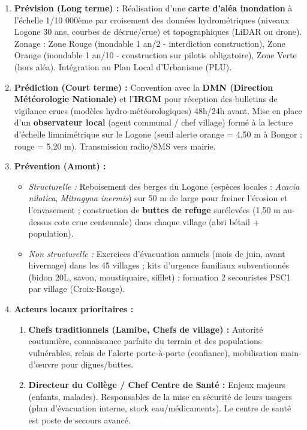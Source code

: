 \documentclass[11pt]{article}
\begin{document}
\begin{corrige}
\begin{enumerate}
    \item \textbf{Prévision (Long terme) :} Réalisation d'une \textbf{carte d'aléa inondation} à l'échelle 1/10 000ème par croisement des données hydrométriques (niveaux Logone 30 ans, courbes de décrue/crue) et topographiques (LiDAR ou drone). Zonage : Zone Rouge (inondable 1 an/2 - interdiction construction), Zone Orange (inondable 1 an/10 - construction sur pilotis obligatoire), Zone Verte (hors aléa). Intégration au Plan Local d'Urbanisme (PLU).
    \item \textbf{Prédiction (Court terme) :} Convention avec la \textbf{DMN (Direction Météorologie Nationale)} et l'\textbf{IRGM} pour réception des bulletins de vigilance crues (modèles hydro-météorologiques) 48h/24h avant. Mise en place d'un \textbf{observateur local} (agent communal / chef village) formé à la lecture d'échelle limnimétrique sur le Logone (seuil alerte orange = 4,50 m à Bongor ; rouge = 5,20 m). Transmission radio/SMS vers mairie.
    \item \textbf{Prévention (Amont) :}
        \begin{itemize}
            \item \textit{Structurelle :} Reboisement des berges du Logone (espèces locales : \emph{Acacia nilotica}, \emph{Mitragyna inermis}) sur 50 m de large pour freiner l'érosion et l'envasement ; construction de \textbf{buttes de refuge} surélevées (1,50 m au-dessus cote crue centennale) dans chaque village (abri bétail + population).
            \item \textit{Non structurelle :} Exercices d'évacuation annuels (mois de juin, avant hivernage) dans les 45 villages ; kits d'urgence familiaux subventionnés (bidon 20L, savon, moustiquaire, sifflet) ; formation 2 secouristes PSC1 par village (Croix-Rouge).
        \end{itemize}
    \item \textbf{Acteurs locaux prioritaires :}
        \begin{enumerate}
            \item \textbf{Chefs traditionnels (Lamibe, Chefs de village) :} Autorité coutumière, connaissance parfaite du terrain et des populations vulnérables, relais de l'alerte porte-à-porte (confiance), mobilisation main-d'œuvre pour digues/buttes.
            \item \textbf{Directeur du Collège / Chef Centre de Santé :} Enjeux majeurs (enfants, malades). Responsables de la mise en sécurité de leurs usagers (plan d'évacuation interne, stock eau/médicaments). Le centre de santé est poste de secours avancé.

\end{enumerate}
\end{enumerate}
\end{corrige}
\end{document}
